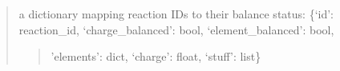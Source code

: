 \documentclass[letterpaper,12pt,english]{sphinxmanual}
\begin{document}
\begin{fulllineitems}
\begin{quote}
\begin{description}
\begin{itemize}
\end{itemize}

\sphinxAtStartPar

\sphinxAtStartPar
{} \textendash{} a dictionary mapping reaction IDs to their balance status:
\{‘id’: reaction\_id, ‘charge\_balanced’: bool, ‘element\_balanced’: bool,
\begin{quote}

\sphinxAtStartPar
’elements’: dict, ‘charge’: float, ‘stuff’: list\}
\end{quote}


\end{description}\end{quote}

\end{fulllineitems}

\end{document}
